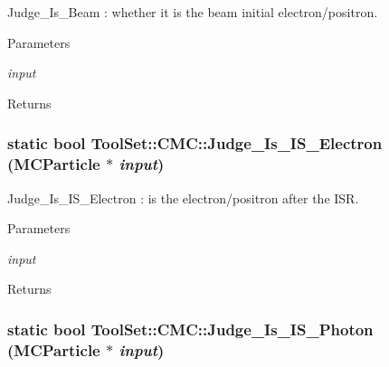 Judge\_\-Is\_\-Beam : whether it is the beam initial electron/positron. 
\begin{DoxyParams}{Parameters}
\item[{\em input}]\end{DoxyParams}
\begin{DoxyReturn}{Returns}

\end{DoxyReturn}
\hypertarget{classToolSet_1_1CMC_a0630c44bcd0eaf761f4b34e106f2b9d9}{
\subsubsection[{Judge\_\-Is\_\-IS\_\-Electron}]{\setlength{\rightskip}{0pt plus 5cm}static bool ToolSet::CMC::Judge\_\-Is\_\-IS\_\-Electron (MCParticle $\ast$ {\em input})}}
\label{classToolSet_1_1CMC_a0630c44bcd0eaf761f4b34e106f2b9d9}


Judge\_\-Is\_\-IS\_\-Electron : is the electron/positron after the ISR. 
\begin{DoxyParams}{Parameters}
\item[{\em input}]\end{DoxyParams}
\begin{DoxyReturn}{Returns}

\end{DoxyReturn}
\hypertarget{classToolSet_1_1CMC_a688d2854fa645f4c3adad5013f4c9ba2}{
\subsubsection[{Judge\_\-Is\_\-IS\_\-Photon}]{\setlength{\rightskip}{0pt plus 5cm}static bool ToolSet::CMC::Judge\_\-Is\_\-IS\_\-Photon (MCParticle $\ast$ {\em input})}}
\label{classToolSet_1_1CMC_a688d2854fa645f4c3adad5013f4c9ba2}


